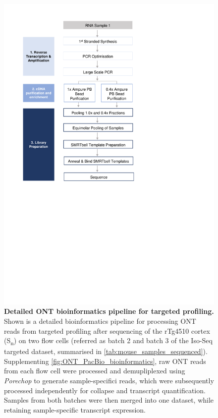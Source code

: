 \begin{figure}[htp]
	\centering
	\includegraphics[page=16,trim={0cm 8cm 0cm 0cm},clip,scale = 0.8]{Figures/ProjectDevelopment_Figures}
	\captionsetup{width=0.95\textwidth,singlelinecheck=off}
	\caption[Detailed ONT bioinformatics pipeline for targeted profiling]%
	{\textbf{Detailed ONT bioinformatics pipeline for targeted profiling.} Shown is a detailed bioinformatics pipeline for processing ONT reads from targeted profiling after sequencing of the rTg4510 cortex (S\textsubscript{n}) on two flow cells (referred as batch 2 and batch 3 of the Iso-Seq targeted dataset, summarised in \cref{tab:mouse_samples_sequenced}). Supplementing \cref{fig:ONT_PacBio_bioinformatics}, raw ONT reads from each flow cell were processed and demupliplexed using \textit{Porechop} to generate sample-specifici reads, which were subsequently processed independently for collapse and transcript quantification. Samples from both batches were then merged into one dataset, while retaining sample-specific transcript expression. 
	}
	\label{fig:ONT_Targeted_bioinformatics}
\end{figure}

